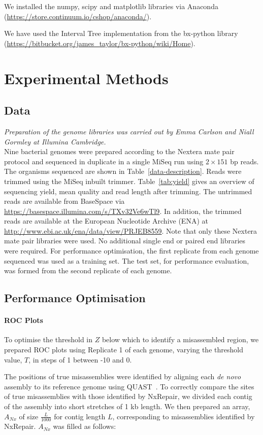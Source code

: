 We installed the numpy, scipy and matplotlib libraries via Anaconda (\url{https://store.continuum.io/cshop/anaconda/}).

We have used the Interval Tree implementation from the bx-python library (\url{https://bitbucket.org/james_taylor/bx-python/wiki/Home}).   

\section{Experimental Methods}
\subsection{Data}
\textit{Preparation of the genome libraries was carried out by Emma Carlson and Niall Gormley at Illumina Cambridge.} \\
Nine bacterial genomes were prepared according to the Nextera mate pair protocol and sequenced in duplicate in a single MiSeq run using $2 \times 151$ bp reads. The organisms sequenced are shown in Table~\ref{data-description}. Reads were trimmed using the MiSeq inbuilt trimmer. Table~\ref{tab:yield} gives an overview of sequencing yield, mean quality and read length after trimming. The untrimmed reads are available from BaseSpace via \url{https://basespace.illumina.com/s/TXv32Ve6wTl9}. In addition,
the trimmed reads are available at the European Nucleotide Archive (ENA) at \url{http://www.ebi.ac.uk/ena/data/view/PRJEB8559}. Note that only these Nextera mate pair libraries were used. No additional single end or paired end libraries were required. For performance optimisation, the first replicate from each genome sequenced was used as a training set. The test set, for performance evaluation, was formed from the second replicate of each genome. 

\subsection{Performance Optimisation}
\paragraph*{ROC Plots}
To optimise the threshold in $Z$ below which to identify a misassembled region, we prepared ROC plots using Replicate 1 of each genome, varying the threshold value, $T$, in steps of 1 between -10 and 0. 

The positions of true misassemblies were identified by aligning each \textit{de novo} assembly to its reference genome using QUAST~\cite{Gurevich2013}. To correctly compare the sites of true misassemblies with those identified by NxRepair, we divided each contig of the assembly into short stretches of 1 kb length. We then prepared an array, $A_{Nx}$ of size $\frac{L}{1000}$ for contig length $L$, corresponding to misassemblies identified by NxRepair. $A_{Nx}$ was filled as follows:

